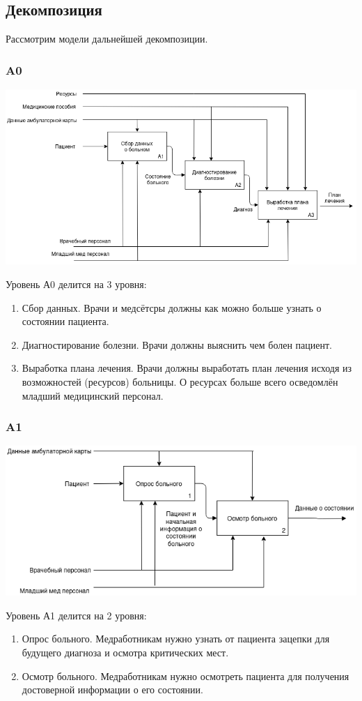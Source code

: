 \documentclass[a4paper, 12pt]{article}
\begin{document}
\subsection{Декомпозиция}
Рассмотрим модели дальнейшей декомпозиции.
\subsubsection{A0}
\begin{center}
  \centering
  \includegraphics[width=.7\linewidth]{extra/as-is_A0.png}
  \label{fig:prplot}
\end{center}
Уровень А0 делится на 3 уровня:
\begin{enumerate}
  \item Сбор данных. Врачи и медсётсры должны как можно больше узнать о состоянии пациента.
  \item Диагностирование болезни. Врачи должны выяснить чем болен пациент.
  \item Выработка плана лечения. Врачи должны выработать план лечения исходя из возможностей (ресурсов) больницы. О ресурсах больше всего осведомлён младший медицинский персонал.
\end{enumerate}
\subsubsection{A1}
\begin{center}
  \centering
  \includegraphics[width=.7\linewidth]{extra/as-is_A1.png}
  \label{fig:prplot}
\end{center}
Уровень А1 делится на 2 уровня:
\begin{enumerate}
  \item Опрос больного. Медработникам нужно узнать от пациента зацепки для будущего диагноза и осмотра критических мест.
  \item Осмотр больного. Медработникам нужно осмотреть пациента для получения достоверной информации о его состоянии.
\end{enumerate}
\end{document}
